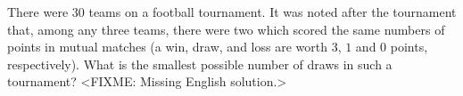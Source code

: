 \problem
There were $30$ teams on a football tournament.
It was noted after the tournament that, among any three teams, there were two
which scored the same numbers of points in mutual matches
(a win, draw, and loss are worth $3$, $1$ and $0$ points, respectively).
What is the smallest possible number of draws in such a tournament?
\solution
<FIXME: Missing English solution.>
\endproblem
